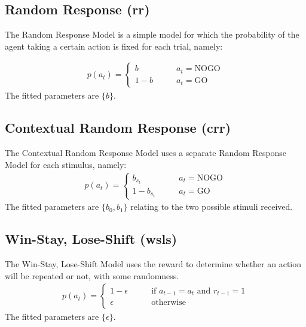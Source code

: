 \documentclass[12pt]{article}
\begin{document}
\subsection{Random Response (rr)}
The Random Response Model is a simple model for which the probability of the agent taking a certain action is fixed for each trial, namely:

\begin{align}
	p(a_t) = \begin{cases}
		b \qquad &a_t = \text{NOGO}\\
		1- b \qquad &a_t = \text{GO}
	\end{cases}
\end{align}
The fitted parameters are $\{b\}$.



\subsection{Contextual Random Response (crr)}
The Contextual Random Response Model uses a separate Random Response Model for each stimulus, namely:
\begin{align}
	p(a_t) = \begin{cases}
		b_{s_t} \qquad &a_t = \text{NOGO}\\
		1- b_{s_t} \qquad &a_t = \text{GO}
	\end{cases}
\end{align}
The fitted parameters are $\{b_0, b_1\}$ relating to the two possible stimuli received.

\subsection{Win-Stay, Lose-Shift (wsls)}
The Win-Stay, Lose-Shift Model uses the reward to determine whether an action will be repeated or not, with some randomness.
\begin{align}
	p(a_t) = \begin{cases}
		1 - \epsilon \qquad &\text{if } a_{t-1} = a_t \text{ and } r_{t-1} = 1\\
		\epsilon \qquad &\text{otherwise} 
	\end{cases}
\end{align}
The fitted parameters are $\{\epsilon\}$.
\end{document}
